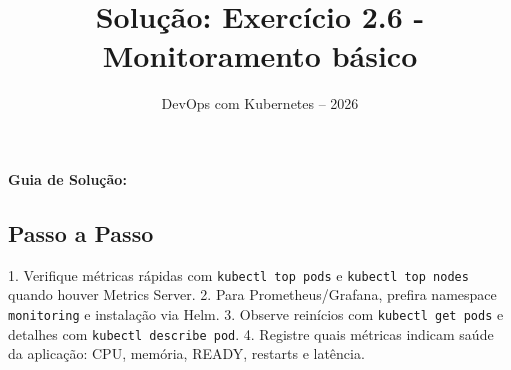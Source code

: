 \documentclass[11pt,a4paper]{article}
\title{\color{secondary}\Huge\textbf{Solução: Exercício 2.6 - Monitoramento básico}}
\author{\color{primary}DevOps com Kubernetes -- 2026}
\date{}
\begin{document}
\maketitle


\textbf{Guia de Solução:}

\subsection*{\color{secondary}Passo a Passo}

1. Verifique métricas rápidas com \texttt{kubectl top pods} e \texttt{kubectl top nodes} quando houver Metrics Server.
2. Para Prometheus/Grafana, prefira namespace \texttt{monitoring} e instalação via Helm.
3. Observe reinícios com \texttt{kubectl get pods} e detalhes com \texttt{kubectl describe pod}.
4. Registre quais métricas indicam saúde da aplicação: CPU, memória, READY, restarts e latência.
\end{document}
